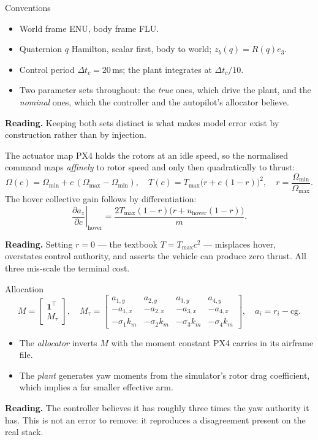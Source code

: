 \documentclass[10pt]{beamer}
\newcommand{\takeaway}[1]{\par\vfill{\footnotesize\textbf{Reading.} #1\par}}
\begin{document}
\begin{frame}{Conventions}
  \begin{itemize}
    \item World frame ENU, body frame FLU.
    \item Quaternion $q$ Hamilton, scalar first, body to world;
      $z_b(q)=R(q)e_3$.
    \item Control period $\Delta t_c=20\,$ms; the plant integrates at
      $\Delta t_c/10$.
    \item Two parameter sets throughout: the \emph{true} ones, which drive
      the plant, and the \emph{nominal} ones, which the controller and the
      autopilot's allocator believe.
  \end{itemize}
  \takeaway{Keeping both sets distinct is what makes model error exist by
    construction rather than by injection.}
\end{frame}

\begin{frame}{The actuator map}
  PX4 holds the rotors at an idle speed, so the normalised command maps
  \emph{affinely} to rotor speed and only then quadratically to thrust:
  {\small
  \[
    \Omega(c)=\Omega_{\min}+c\,(\Omega_{\max}-\Omega_{\min}),
    \quad
    T(c)=T_{\max}\big(r+c\,(1-r)\big)^{2},
    \quad r=\frac{\Omega_{\min}}{\Omega_{\max}} .
  \]}
  The hover collective gain follows by differentiation:
  {\small
  \[
    \left.\frac{\partial a_z}{\partial c}\right|_{\mathrm{hover}}
    =\frac{2T_{\max}(1-r)\big(r+u_{\mathrm{hover}}(1-r)\big)}{m}.
  \]}
  \takeaway{Setting $r=0$ --- the textbook $T=T_{\max}c^{2}$ --- misplaces
    hover, overstates control authority, and asserts the vehicle can produce
    zero thrust. All three mis-scale the terminal cost.}
\end{frame}

\begin{frame}{Allocation}
  {\small
  \[
    M=\begin{bmatrix}\mathbf 1^{\!\top}\\ M_\tau\end{bmatrix},
    \quad
    M_\tau=\begin{bmatrix}
      a_{1,y} & a_{2,y} & a_{3,y} & a_{4,y}\\
      -a_{1,x} & -a_{2,x} & -a_{3,x} & -a_{4,x}\\
      -\sigma_1k_m & -\sigma_2k_m & -\sigma_3k_m & -\sigma_4k_m
    \end{bmatrix},
    \quad a_i=r_i-\mathrm{cg}.
  \]}
  \begin{itemize}
    \item The \emph{allocator} inverts $M$ with the moment constant PX4
      carries in its airframe file.
    \item The \emph{plant} generates yaw moments from the simulator's rotor
      drag coefficient, which implies a far smaller effective arm.
  \end{itemize}
  \takeaway{The controller believes it has roughly three times the yaw
    authority it has. This is not an error to remove: it reproduces a
    disagreement present on the real stack.}
\end{frame}
\end{document}
